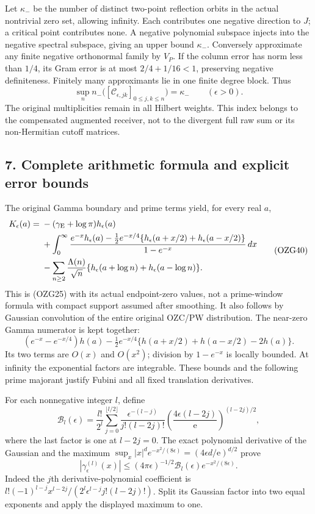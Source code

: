 \documentclass[
  10pt,
  a4paper,
]{article}
\begin{document}
Let \(\kappa_-\) be the number of distinct two-point reflection orbits
in the actual nontrivial zero set, allowing infinity. Each contributes
one negative direction to \(J\); a critical point contributes none. A
negative polynomial subspace injects into the negative spectral
subspace, giving an upper bound \(\kappa_-\). Conversely approximate any
finite negative orthonormal family by \(V_P\). If the column error has
norm less than \(1/4\), its Gram error is at most \(2/4+1/16<1\),
preserving negative definiteness. Finitely many approximants lie in one
finite degree block. Thus \[
\boxed{\sup_n n_-\bigl([\mathcal C_{\epsilon,jk}]_{0\le j,k\le n}\bigr)
=\kappa_-\qquad(\epsilon>0).}
\tag{OZG39}
\] The original multiplicities remain in all Hilbert weights. This index
belongs to the compensated augmented receiver, not to the divergent full
raw sum or its non-Hermitian cutoff matrices.

\subsection{7. Complete arithmetic formula and explicit error
bounds}\label{complete-arithmetic-formula-and-explicit-error-bounds}

The original Gamma boundary and prime terms yield, for every real \(a\),
\[
\begin{aligned}
K_\epsilon(a)={}&-(\gamma_{\rm E}+\log\pi)h_\epsilon(a)\\
&+\int_0^\infty
\frac{e^{-x}h_\epsilon(a)-\tfrac12e^{-x/4}
\{h_\epsilon(a+x/2)+h_\epsilon(a-x/2)\}}
{1-e^{-x}}\,dx\\
&-\sum_{n\ge2}\frac{\Lambda(n)}{\sqrt n}
\{h_\epsilon(a+\log n)+h_\epsilon(a-\log n)\}.
\end{aligned}
\tag{OZG40}
\] This is (OZG25) with its actual endpoint-zero values, not a
prime-window formula with compact support assumed after smoothing. It
also follows by Gaussian convolution of the entire original OZC/PW
distribution. The near-zero Gamma numerator is kept together: \[
(e^{-x}-e^{-x/4})h(a)
-\tfrac12e^{-x/4}\{h(a+x/2)+h(a-x/2)-2h(a)\}.
\tag{OZG41}
\] Its two terms are \(O(x)\) and \(O(x^2)\); division by \(1-e^{-x}\)
is locally bounded. At infinity the exponential factors are integrable.
These bounds and the following prime majorant justify Fubini and all
fixed translation derivatives.

For each nonnegative integer \(l\), define \[
\mathcal B_l(\epsilon)=\frac{l!}{2^l}
\sum_{j=0}^{\lfloor l/2\rfloor}
\frac{\epsilon^{-(l-j)}}{j!(l-2j)!}
\left(\frac{4\epsilon(l-2j)}{\mathrm e}\right)^{(l-2j)/2},
\tag{OZG42}
\] where the last factor is one at \(l-2j=0\). The exact polynomial
derivative of the Gaussian and the maximum
\(\sup_x|x|^d e^{-x^2/(8\epsilon)}
=(4\epsilon d/\mathrm e)^{d/2}\) prove \[
|\gamma_\epsilon^{(l)}(x)|
\le(4\pi\epsilon)^{-1/2}\mathcal B_l(\epsilon)
e^{-x^2/(8\epsilon)} .
\tag{OZG43}
\] Indeed the \(j\)th derivative-polynomial coefficient is
\(l!(-1)^{l-j}x^{l-2j}/(2^l\epsilon^{l-j}j!(l-2j)!)\). Split its
Gaussian factor into two equal exponents and apply the displayed maximum
to one.
\end{document}
